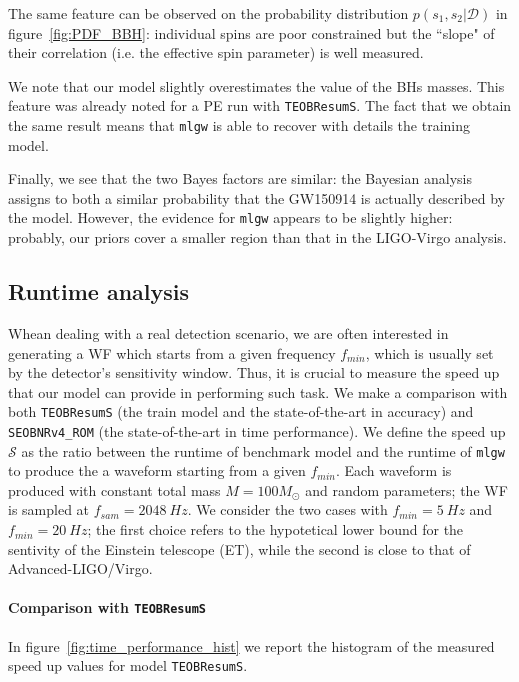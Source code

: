 The same feature can be observed on the probability distribution $p(s_1,s_2|\mathcal{D})$ in figure~\ref{fig:PDF_BBH}: individual spins are poor constrained but the ``slope" of their correlation (i.e. the effective spin parameter) is well measured.
\par
We note that our model slightly overestimates the value of the BHs masses. This feature was already noted for a PE run with \texttt{TEOBResumS}. The fact that we obtain the same result means that \texttt{mlgw} is able to recover with details the training model.
\par
Finally, we see that the two Bayes factors are similar: the Bayesian analysis assigns to both a similar probability that the GW150914 is actually described by the model.
However, the evidence for \texttt{mlgw} appears to be slightly higher: probably, our priors cover a smaller region than that in the LIGO-Virgo analysis.
\par
\subsection{Runtime analysis} \label{sec:runtime}
Whean dealing with a real detection scenario, we are often interested in generating a WF which starts from a given frequency $f_{min}$, which is usually set by the detector's sensitivity window.
Thus, it is crucial to measure the speed up that our model can provide in performing such task.
We make a comparison with both \texttt{TEOBResumS} (the train model and the state-of-the-art in accuracy) and \texttt{SEOBNRv4\_ROM} (the state-of-the-art in time performance).
We define the speed up $\mathcal{S}$ as the ratio between the runtime of benchmark model and the runtime of \texttt{mlgw} to produce the a waveform starting from a given $f_{min}$. Each waveform is produced with constant total mass $M = 100 M_{\odot}$ and random parameters; the WF is sampled at $f_{sam} = \SI{2048}{Hz}$.
We consider the two cases with $f_{min} = \SI{5}{Hz}$ and $f_{min} = \SI{20}{Hz}$; the first choice refers to the hypotetical lower bound for the sentivity of the Einstein telescope (ET), while the second is close to that of Advanced-LIGO/Virgo.
\paragraph{Comparison with \texttt{TEOBResumS}}
In figure~\ref{fig:time_performance_hist} we report the histogram of the measured speed up values for model \texttt{TEOBResumS}.

